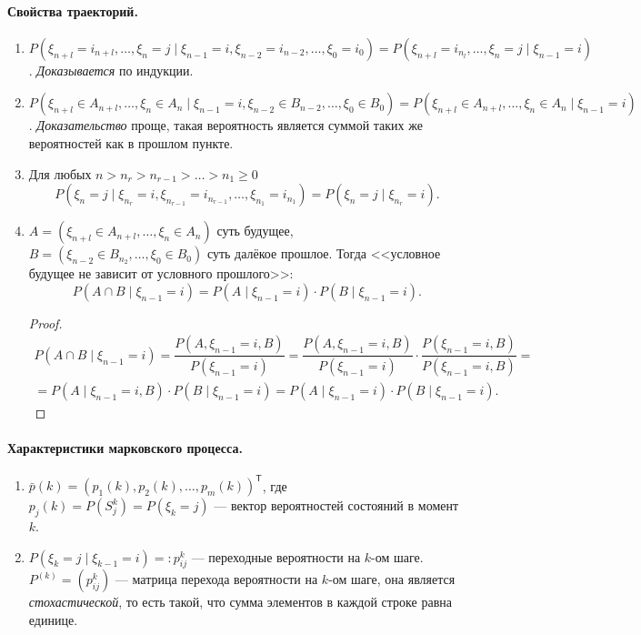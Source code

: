 \paragraph{Свойства траекторий.}
\begin{enumerate}
  \item $P(\xi_{n+l} = i_{n+l}, \dots, \xi_n=j \mid \xi_{n-1}=i, \xi_{n-2} =
    i_{n-2}, \dots, \xi_0 = i_0) = P(\xi_{n+l} = i_{n_l}, \dots, \xi_n = j \mid \xi_{n-1} = i)$.
    \emph{Доказывается} по индукции.

  \item $P(\xi_{n+l} \in A_{n+l}, \dots, \xi_n\in A_{n} \mid \xi_{n-1} = i,
    \xi_{n-2} \in B_{n-2}, \dots, \xi_0 \in B_0) = P(\xi_{n+l} \in A_{n+l},
    \dots, \xi_n \in A_n \mid \xi_{n-1} = i)$. \emph{Доказательство} проще, такая вероятность является суммой таких же вероятностей как в прошлом пункте.

  \item Для любых $n > n_r > n_{r-1} > \ldots > n_1 \geqslant 0$
    \[
      P(\xi_n = j \mid \xi_{n_r}=i, \xi_{n_{r-1}} = i_{n_{r-1}}, \dots, \xi_{n_1} =
      i_{n_1})
      = P(\xi_n=j \mid \xi_{n_r} = i).
    \]

  \item $A = \left( \xi_{n+l} \in A_{n+l}, \dots, \xi_n \in A_n \right)$ суть
    будущее,
    $B = \left( \xi_{n-2}\in B_{n_2}, \ldots, \xi_0 \in B_0 \right) $ суть далёкое прошлое.
    Тогда <<условное будущее не зависит от условного прошлого>>:
    \[
      P(A \cap B \mid \xi_{n-1} =i) = P(A \mid \xi_{n-1} = i) \cdot P(B \mid
      \xi_{n-1} = i).
    \]
    \begin{proof}
      \begin{multline*}
        P(A \cap B \mid \xi_{n-1} = i) = \dfrac{P(A, \xi_{n-1} = i, B)}{P(\xi_{n-1} = i)} 
        = \dfrac{P(A, \xi_{n-1} = i, B)}{P(\xi_{n-1} = i)} \cdot \dfrac{P(\xi_{n-1}=i, B)}{P(\xi_{n-1}=i, B)} = \\
        = P(A \mid \xi_{n-1}=i, B) \cdot P(B \mid \xi_{n-1}=i)
        = P(A \mid \xi_{n-1}=i) \cdot P(B \mid \xi_{n-1}=i).
      \end{multline*}
    \end{proof}
\end{enumerate}

\paragraph{Характеристики марковского процесса.}
\begin{enumerate}
  \item $\bar{p}(k) = \left( p_1 (k), p_2(k), \dots, p_m(k)\right)^{\mathsf T} $,
    где $p_j(k) = P(S_j^k) = P(\xi_k = j)$ --- вектор вероятностей состояний в
    момент $ k $.

  \item $P(\xi_k = j \mid \xi_{k-1} = i) =: p_{ij}^{k}$ --- переходные вероятности на $k$-ом шаге.
    $P^{(k)} = (p_{ij}^k)$ --- матрица перехода вероятности на $k$-ом шаге, она является
    \emph{стохастической}, то есть такой, что сумма элементов в каждой строке равна
    единице.
\end{enumerate}

